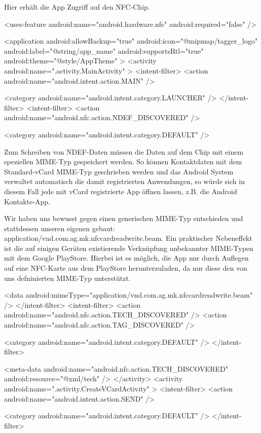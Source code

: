 \documentclass[a4paper,ngerman,12pt]{scrreprt}
\newcommand{\+}{\discretionary{\mbox{\scriptsize$\hookleftarrow$}}{}{}}
\begin{document}
Hier erhält die App Zugriff auf den N\+F\+C-\/\+Chip. \begin{DoxyVerb}    <uses-feature
        android:name="android.hardware.nfc"
        android:required="false" />

    <application
        android:allowBackup="true"
        android:icon="@mipmap/tagger_logo"
        android:label="@string/app_name"
        android:supportsRtl="true"
        android:theme="@style/AppTheme" >
        <activity android:name=".activity.MainActivity" >
            <intent-filter>
                <action android:name="android.intent.action.MAIN" />

                <category android:name="android.intent.category.LAUNCHER" />
            </intent-filter>
            <intent-filter>
                <action android:name="android.nfc.action.NDEF_DISCOVERED" />

                <category android:name="android.intent.category.DEFAULT" />
\end{DoxyVerb}


Zum Schreiben von N\+D\+E\+F-\/\+Daten müssen die Daten auf dem Chip mit einem speziellen M\+I\+M\+E-\/\+Typ gespeichert werden. So können Kontaktdaten mit dem Standard-\/v\+Card M\+I\+M\+E-\/\+Typ geschrieben werden und das Android System verwaltet automatisch die damit registrierten Anwendungen, so würde sich in diesem Fall jede mit v\+Card registrierte App öffnen lassen, z.\+B. die Android Kontakte-\/\+App.

Wir haben uns bewusst gegen einen generischen M\+I\+M\+E-\/\+Typ entschieden und stattdessen unseren eigenen gebaut:  application/vnd.\+com.\+ag.\+mk.\+nfccardreadwrite.\+beam. Ein praktischer Nebeneffekt ist die auf einigen Geräten existierende Verknüpfung unbekannter M\+I\+M\+E-\/\+Typen mit dem Google Play\+Store. Hierbei ist es möglich, die App nur durch Auflegen auf eine N\+F\+C-\/\+Karte aus dem Play\+Store herunterzuladen, da nur diese den von uns defninierten M\+I\+M\+E-\/\+Typ unterstützt. \begin{DoxyVerb}                <data android:mimeType="application/vnd.com.ag.mk.nfccardreadwrite.beam" />
            </intent-filter>
            <intent-filter>
                <action android:name="android.nfc.action.TECH_DISCOVERED" />
                <action android:name="android.nfc.action.TAG_DISCOVERED" />

                <category android:name="android.intent.category.DEFAULT" />
            </intent-filter>

            <meta-data
                android:name="android.nfc.action.TECH_DISCOVERED"
                android:resource="@xml/tech" />
        </activity>
        <activity android:name=".activity.CreateVCardActivity" >
            <intent-filter>
                <action android:name="android.intent.action.SEND" />

                <category android:name="android.intent.category.DEFAULT" />
            </intent-filter>
\end{DoxyVerb}
\end{document}
